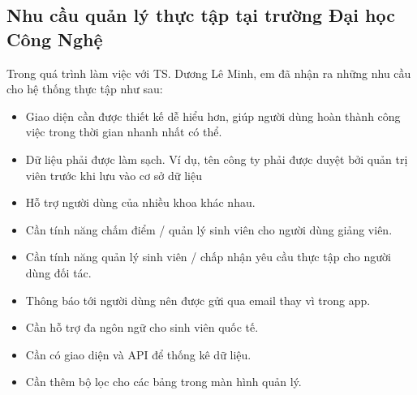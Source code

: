 \documentclass[./../main.tex]{subfiles}
\begin{document}
\subsection{Nhu cầu quản lý thực tập tại trường Đại học Công Nghệ}

Trong quá trình làm việc với TS. Dương Lê Minh, em đã nhận ra những nhu
cầu cho hệ thống thực tập như sau:

\begin{itemize}
\item
  
  Giao diện cần được thiết kế dễ hiểu hơn, giúp người dùng hoàn thành
  công việc trong thời gian nhanh nhất có thể.
  
\item
  
  Dữ liệu phải được làm sạch. Ví dụ, tên công ty phải được duyệt bởi
  quản trị viên trước khi lưu vào cơ sở dữ liệu
  
\item
  
  Hỗ trợ người dùng của nhiều khoa khác nhau.
  
\item
  
  Cần tính năng chấm điểm / quản lý sinh viên cho người dùng giảng viên.
  
\item
  
  Cần tính năng quản lý sinh viên / chấp nhận yêu cầu thực tập cho người
  dùng đối tác.
  
\item
  
  Thông báo tới người dùng nên được gửi qua email thay vì trong app.
  
\item
  
  Cần hỗ trợ đa ngôn ngữ cho sinh viên quốc tế.
  
\item
  
  Cần có giao diện và API để thống kê dữ liệu.
  
\item
  
  Cần thêm bộ lọc cho các bảng trong màn hình quản lý.
  
\end{itemize}
\end{document}

